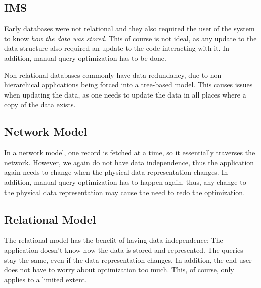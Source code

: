 \documentclass{article}
\begin{document}
\subsection{IMS}
Early databases were not relational and they also required the user of the system to know \textit{how the data was stored}.
This of course is not ideal, as any update to the data structure also required an update to the code interacting with it.
In addition, manual query optimization has to be done.

Non-relational databases commonly have data redundancy, due to non-hierarchical applications being forced into a tree-based model.
This causes issues when updating the data, as one needs to update the data in all places where a copy of the data exists.

\subsection{Network Model}
In a network model, one \gls{record} is fetched at a time, so it essentially traverses the network.
However, we again do not have data independence, thus the application again needs to change when the physical data representation changes.
In addition, manual query optimization has to happen again, thus, any change to the physical data representation may cause the need to redo the optimization.

\subsection{Relational Model}

The relational model has the benefit of having data independence: The application doesn't know how the data is stored and represented.
The queries stay the same, even if the data representation changes.
In addition, the end user does not have to worry about optimization too much. This, of course, only applies to a limited extent.












\printGlossary
\end{document}
